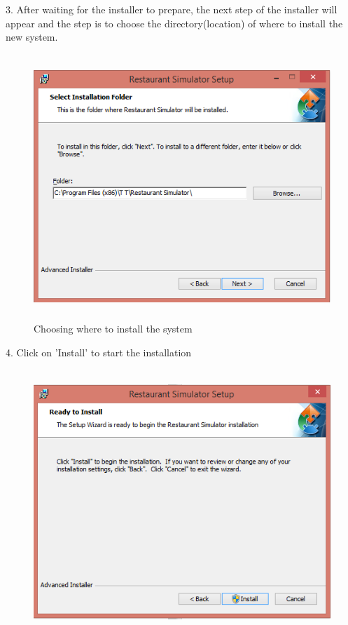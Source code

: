 \begin{landscape}
3. After waiting for the installer to prepare, the next step of the installer will appear and the step is to choose the directory(location) of where to install the new system.

\begin{figure}[H]
    \includegraphics[height = 10cm]{./Manual/images/install3} 
    \caption{Choosing where to install the system} \label{fig:install3}
\end{figure}

4.  Click on 'Install' to start the installation

\begin{figure}[H]
    \includegraphics[height = 10cm]{./Manual/images/install4} 
    \caption{} \label{fig:install4}
\end{figure}


\end{landscape}
